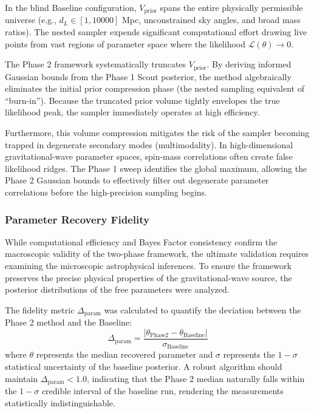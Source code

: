 \documentclass[12pt]{article}
\begin{document}
In the blind Baseline configuration, $V_{\text{prior}}$ spans the entire physically permissible universe (e.g., $d_L \in [1, 10000]$ Mpc, unconstrained sky angles, and broad mass ratios). The nested sampler expends significant computational effort drawing live points from vast regions of parameter space where the likelihood $\mathcal{L}(\theta) \to 0$.

The Phase 2 framework systematically truncates $V_{\text{prior}}$. By deriving informed Gaussian bounds from the Phase 1 Scout posterior, the method algebraically eliminates the initial prior compression phase (the nested sampling equivalent of ``burn-in''). Because the truncated prior volume tightly envelopes the true likelihood peak, the sampler immediately operates at high efficiency.

Furthermore, this volume compression mitigates the risk of the sampler becoming trapped in degenerate secondary modes (multimodality). In high-dimensional gravitational-wave parameter spaces, spin-mass correlations often create false likelihood ridges. The Phase 1 sweep identifies the global maximum, allowing the Phase 2 Gaussian bounds to effectively filter out degenerate parameter correlations before the high-precision sampling begins.

\subsubsection{Parameter Recovery Fidelity}
While computational efficiency and Bayes Factor consistency confirm the macroscopic validity of the two-phase framework, the ultimate validation requires examining the microscopic astrophysical inferences. To ensure the framework preserves the precise physical properties of the gravitational-wave source, the posterior distributions of the free parameters were analyzed.

The fidelity metric $\Delta_{\text{param}}$ was calculated to quantify the deviation between the Phase 2 method and the Baseline:
\begin{equation}
    \Delta_{\text{param}} = \frac{|\theta_{\text{Phase2}} - \theta_{\text{Baseline}}|}{\sigma_{\text{Baseline}}}
\end{equation}
where $\theta$ represents the median recovered parameter and $\sigma$ represents the $1-\sigma$ statistical uncertainty of the baseline posterior. A robust algorithm should maintain $\Delta_{\text{param}} < 1.0$, indicating that the Phase 2 median naturally falls within the $1-\sigma$ credible interval of the baseline run, rendering the measurements statistically indistinguishable.
\end{document}
